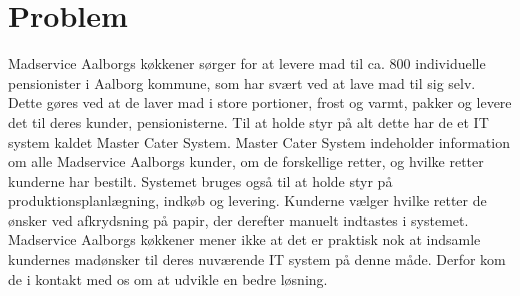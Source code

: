 \chapter{Problem}
Madservice Aalborgs køkkener sørger for at levere mad til ca. 800 individuelle pensionister i Aalborg kommune, som har svært ved at lave mad til sig selv.
Dette gøres ved at de laver mad i store portioner, frost og varmt, pakker og levere det til deres kunder, pensionisterne.
Til at holde styr på alt dette har de et IT system kaldet Master Cater System.
Master Cater System indeholder information om alle Madservice Aalborgs kunder, om de forskellige retter, og hvilke retter kunderne har bestilt.
Systemet bruges også til at holde styr på produktionsplanlægning, indkøb og levering.
Kunderne vælger hvilke retter de ønsker ved afkrydsning på papir, der derefter manuelt indtastes i systemet.
Madservice Aalborgs køkkener mener ikke at det er praktisk nok at indsamle kundernes madønsker til deres nuværende IT system på denne måde.
Derfor kom de i kontakt med os om at udvikle en bedre løsning.




